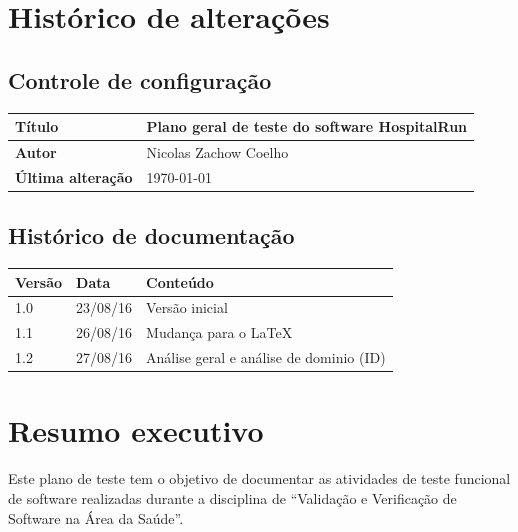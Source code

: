 \tableofcontents

\newpage

\section*{Histórico de alterações}

\subsection*{Controle de configuração}

\begin{table}[h]
\centering
\begin{tabular}{|l|l|}
 \hline
\textbf{Título} & Plano geral de teste do software \textbf{HospitalRun} \\\hline
\textbf{Autor} & Nicolas Zachow Coelho \\\hline
\textbf{Última alteração} & \today  \\\hline
\end{tabular}
\end{table}


\subsection*{Histórico de documentação}

\begin{table}[h]
\centering
\begin{tabular}{|l|l|l|}
 \hline
    \textbf{Versão} &  \textbf{ Data } & \textbf{Conteúdo} \\\hline
    1.0 & 23/08/16 & Versão inicial \\\hline
    1.1 & 26/08/16 & Mudança para o \LaTeX \\\hline
    1.2 & 27/08/16 & Análise geral e análise de dominio (ID) \\\hline
\end{tabular}
\end{table}

\newpage

\section*{Resumo executivo}
Este plano de teste tem o objetivo de documentar as atividades de teste
funcional de software realizadas durante a disciplina de “Validação e
Verificação de Software na Área da Saúde”.

